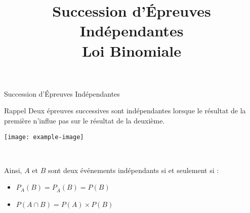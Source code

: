 \documentclass{cours}
\title{Succession d'Épreuves Indépendantes \\ Loi Binomiale}
\begin{document}

    \begin{Gpartie}{Succession d'Épreuves Indépendantes} 
        \begin{Spartie}{Rappel} 
            Deux épreuves successives sont indépendantes lorsque le résultat de la première n'influe pas sur le résultat de la deuxième.

            \begin{center}
                    \texttt{[image: example-image]}
                \parbox{\linewidth}{} \\[2ex]
            \end{center}
            Ainsi, $A$ et $B$ sont deux événements indépendants si et seulement si :
            \begin{itemize}
                \item $P_A(B)=P_{\overline{A}}(B)=P(B)$
                \item $P(A\cap B)=P(A)\times P(B)$
            \end{itemize}
        \end{Spartie}
    \end{Gpartie}
\end{document}
